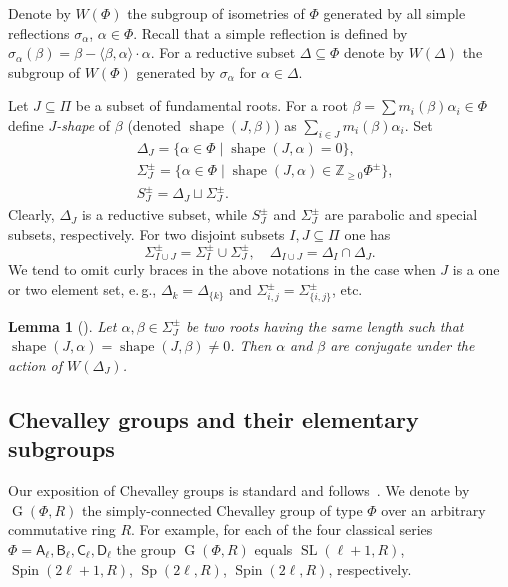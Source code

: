 \documentclass[oneside, 12pt]{amsart}
\theoremstyle{plain}
\numberwithin{equation}{section}
\newtheorem{lemma}{Lemma}
\numberwithin{lemma}{section}
\theoremstyle{definition}
\theoremstyle{remark}
\DeclareMathOperator{\G}{G}
\DeclareMathOperator{\SL}{SL}
\DeclareMathOperator{\Sp}{Sp}
\DeclareMathOperator{\shape}{shape}
\DeclareMathOperator{\Spin}{Spin}
\newcommand{\rA}{\mathsf{A}}
\newcommand{\rB}{\mathsf{B}}
\newcommand{\rC}{\mathsf{C}}
\newcommand{\rD}{\mathsf{D}}
\begin{document}
Denote by $W(\Phi)$ the subgroup of isometries of $\Phi$ generated by all simple reflections $\sigma_\alpha$, $\alpha\in\Phi$. Recall that a simple reflection is defined by $\sigma_\alpha(\beta)=\beta-\langle\beta, \alpha \rangle\cdot \alpha$.
For a reductive subset $\Delta\subseteq \Phi$ denote by $W(\Delta)$ the subgroup of $W(\Phi)$ generated by $\sigma_\alpha$ for $\alpha\in\Delta$.

Let $J\subseteq \Pi$ be a subset of fundamental roots. 
For a root $\beta = \sum m_i(\beta)\alpha_i \in \Phi$ define \emph{$J$-shape} of $\beta$ (denoted $\shape(J, \beta)$) as $\sum_{i\in J} m_i(\beta) \alpha_i$.
Set
\begin{align*}
& \Delta_J = \{\alpha \in \Phi \mid \shape(J, \alpha)=0\}, \\
& \Sigma^\pm_J = \{\alpha \in \Phi \mid \shape(J, \alpha) \in \mathbb{Z}_{\geqslant0} \Phi^\pm \}, \\
& S_J^\pm = \Delta_J \sqcup \Sigma_J^\pm.
\end{align*}
Clearly, $\Delta_J$ is a reductive subset, while $S^\pm_J$ and $\Sigma^\pm_J$ are parabolic and special subsets, respectively.
For two disjoint subsets $I, J\subseteq \Pi$ one has 
\[ \Sigma^\pm_{I \cup J} = \Sigma^\pm_I\cup\Sigma^\pm_J, \quad \Delta_{I\cup J} = \Delta_I \cap \Delta_J. \]
We tend to omit curly braces in the above notations in the case when $J$ is a one or two element set, e.\,g., $\Delta_k=\Delta_{\{k\}}$ and $\Sigma_{i, j}^\pm=\Sigma_{\{i, j\}}^\pm$, etc.

\begin{lemma}[{\cite[Lemma~1]{ABS}}]\label{lemma:abs}
Let $\alpha, \beta \in \Sigma^\pm_J$ be two roots having the same length such that $\shape(J, \alpha)=\shape(J, \beta)\neq 0$.
Then $\alpha$ and $\beta$ are conjugate under the action of $W(\Delta_J)$.
\end{lemma}

\subsection{Chevalley groups and their elementary subgroups} \label{sec:elementary}
Our exposition of Chevalley groups is standard and follows~\cite{Ta, S, St78, VP, Va86}.
We denote by $\G(\Phi, R)$ the simply-connected Chevalley group of type $\Phi$ over an arbitrary commutative ring $R$. For example, for each of the four classical series $\Phi=\rA_\ell, \rB_\ell, \rC_\ell, \rD_\ell$
the group $\G(\Phi, R)$ equals $\SL(\ell+1, R)$, $\Spin(2\ell+1, R)$, $\Sp(2\ell, R)$, $\Spin(2\ell, R)$, respectively. 
\end{document}
